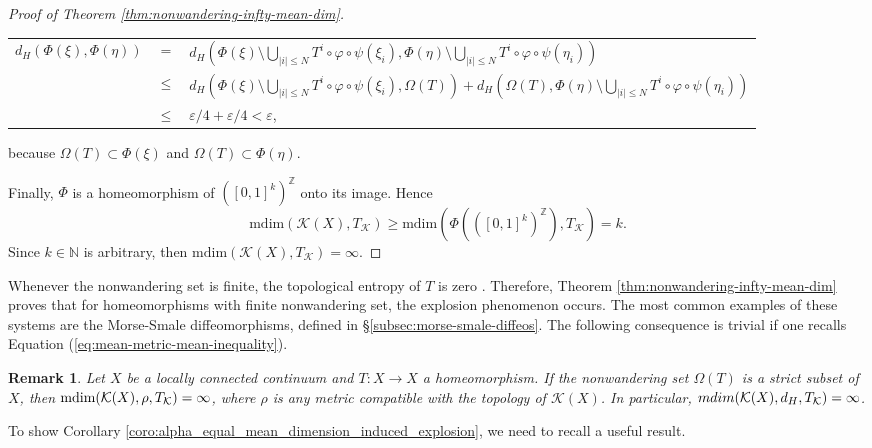 \documentclass[sn-mathphys-num]{sn-jnl}%
\theoremstyle{thmstyleone}%
\theoremstyle{thmstyletwo}%
\newtheorem{remark}{Remark}%
\theoremstyle{thmstylethree}%
\newcommand{\abs}[1]{\lvert#1\rvert}
\newcommand*\induce[1]{#1_\mathcal{K}}
\newcommand*\hyp[1]{\mathcal{#1}}
\begin{document}
\begin{proof}[Proof of Theorem \emph{\ref{thm:nonwandering-infty-mean-dim}}]
    \begin{center}
    \begin{tabular}{ l l l }
    $d_H(\Phi(\xi), \Phi(\eta))$ & $=$ & $d_H(\Phi(\xi)\setminus\bigcup\limits_{\abs{i} \leq N} T^i\circ\varphi\circ\psi(\xi_i), \Phi(\eta)\setminus\bigcup\limits_{\abs{i} \leq N} T^i\circ\varphi\circ\psi(\eta_i))$\\
    & $\leq$ & $d_H(\Phi(\xi)\setminus\bigcup\limits_{\abs{i} \leq N} T^i\circ\varphi\circ\psi(\xi_i), \Omega(T)) + d_H(\Omega(T), \Phi(\eta)\setminus\bigcup\limits_{\abs{i} \leq N} T^i\circ\varphi\circ\psi(\eta_i))$\\
     & $\leq$ & $\varepsilon/4 + \varepsilon/4 < \varepsilon$,
    \end{tabular}
    \end{center}
    because $\Omega(T) \subset \Phi(\xi)$ and $\Omega(T) \subset \Phi(\eta)$.

    Finally, $\Phi$ is a homeomorphism of $([0, 1]^k)^\mathbb{Z}$ onto its image. Hence
    \begin{equation*}
        \text{mdim}(\hyp{K}(X), \induce{T}) \geq \text{mdim}(\Phi(([0, 1]^k)^\mathbb{Z}), \induce{T}) = k.
    \end{equation*}
    Since $k \in \mathbb{N}$ is arbitrary, then $\text{mdim}(\hyp{K}(X), \induce{T}) = \infty$.
\end{proof}


Whenever the nonwandering set is finite, the topological entropy of $T$ is zero \cite[Proposition 1 \& 2]{lampart_raith_2010}. Therefore, Theorem \ref{thm:nonwandering-infty-mean-dim} proves that for homeomorphisms with finite nonwandering set, the explosion phenomenon occurs. The most common examples of these systems are the Morse-Smale diffeomorphisms, defined in §\ref{subsec:morse-smale-diffeos}. The following consequence is trivial if one recalls Equation (\ref{eq:mean-metric-mean-inequality}).\\

\begin{remark}
    Let $X$ be a locally connected continuum and $T: X \to X$ a homeomorphism. If the nonwandering set $\Omega(T)$ is a strict subset of $X$, then $\normalfont{\text{mdim}}(\hyp{K}(X),\rho, \induce{T}) = \infty$, where $\rho$ is any metric compatible with the topology of $\hyp{K}(X)$. In particular, $\emph{mdim}(\hyp{K}(X), d_H, \induce{T}) = \infty$.\\
\end{remark}

To show Corollary \ref{coro:alpha_equal_mean_dimension_induced_explosion}, we need to recall a useful result.\\
\end{document}
